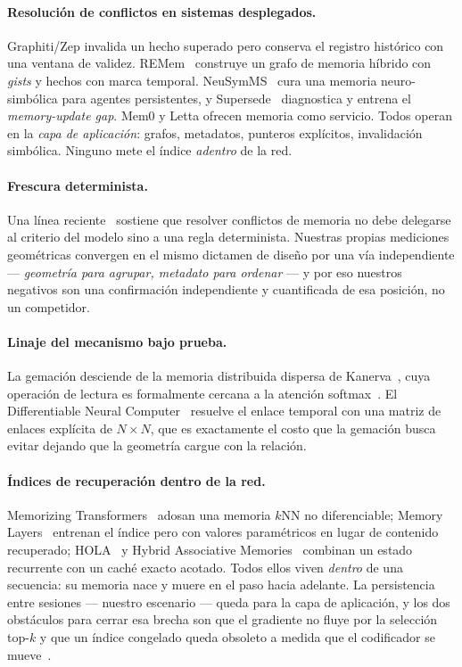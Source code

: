 \documentclass[11pt,a4paper]{article}
\begin{document}
\paragraph{Resolución de conflictos en sistemas desplegados.} Graphiti/Zep invalida un hecho superado
pero conserva el registro histórico con una ventana de validez. REMem~\cite{remem} construye un grafo
de memoria híbrido con \emph{gists} y hechos con marca temporal. NeuSymMS~\cite{neusymms} cura una
memoria neuro-simbólica para agentes persistentes, y Supersede~\cite{supersede} diagnostica y entrena
el \emph{memory-update gap}. Mem0 y Letta ofrecen memoria como servicio. Todos operan en la
\emph{capa de aplicación}: grafos, metadatos, punteros explícitos, invalidación simbólica. Ninguno
mete el índice \emph{adentro} de la red.

\paragraph{Frescura determinista.} Una línea reciente~\cite{freshness} sostiene que resolver
conflictos de memoria no debe delegarse al criterio del modelo sino a una regla determinista.
Nuestras propias mediciones geométricas convergen en el mismo dictamen de diseño por una vía
independiente --- \emph{geometría para agrupar, metadato para ordenar} --- y por eso nuestros
negativos son una confirmación independiente y cuantificada de esa posición, no un competidor.

\paragraph{Linaje del mecanismo bajo prueba.} La gemación desciende de la memoria distribuida
dispersa de Kanerva~\cite{kanerva}, cuya operación de lectura es formalmente cercana a la atención
softmax~\cite{sdmattention}. El Differentiable Neural Computer~\cite{dnc} resuelve el enlace temporal
con una matriz de enlaces explícita de $N \times N$, que es exactamente el costo que la gemación
busca evitar dejando que la geometría cargue con la relación.

\paragraph{Índices de recuperación dentro de la red.} Memorizing Transformers~\cite{memorizing}
adosan una memoria $k$NN no diferenciable; Memory Layers~\cite{memlayers} entrenan el índice pero con
valores paramétricos en lugar de contenido recuperado; HOLA~\cite{hola} y Hybrid Associative
Memories~\cite{ham} combinan un estado recurrente con un caché exacto acotado. Todos ellos viven
\emph{dentro} de una secuencia: su memoria nace y muere en el paso hacia adelante. La persistencia
entre sesiones --- nuestro escenario --- queda para la capa de aplicación, y los dos obstáculos para
cerrar esa brecha son que el gradiente no fluye por la selección top-$k$ y que un índice congelado
queda obsoleto a medida que el codificador se mueve~\cite{basu,querydrift}.
\end{document}
